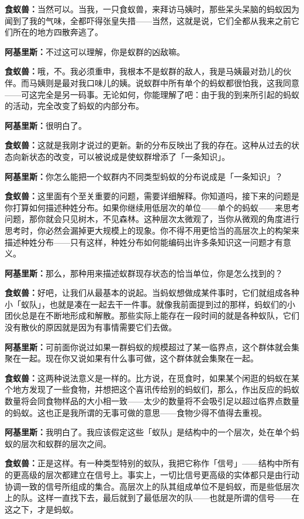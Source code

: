 \documentclass[
  12pt,
  twoside,
  openright,
  oldfontcommands,
]{memoir}
\newcommand{\dialogname}[1]{{\heifamily\bfseries #1}}
\begin{document}
\dialogname{食蚁兽：}当然可以。当我，一只食蚁兽，来拜访马姨时，那些呆头呆脑的蚂蚁因为闻到了我的气味，全都吓得张皇失措------当然，这就是说，它们全都从我来之前它们所在的地方四散奔逃了。

\dialogname{阿基里斯：}不过这可以理解，你是蚁群的凶敌嘛。

\dialogname{食蚁兽：}哦，不。我必须重申，我根本不是蚁群的敌人，我是马姨最对劲儿的伙伴。而马姨则是最对我口味儿的姨。说蚁群中所有单个的蚂蚁都很怕我，这我同意------可这完全是另一码事。无论如何，你能理解了吧：由于我的到来所引起的蚂蚁的活动，完全改变了蚂蚁的内部分布。

\dialogname{阿基里斯：}很明白了。

\dialogname{食蚁兽：}这就是我刚才说过的更新。新的分布反映出了我的存在。这种从过去的状态向新状态的改变，可以被说成是使蚁群增添了「一条知识」。

\dialogname{阿基里斯：}你怎么能把一个蚁群内不同类型蚂蚁的分布说成是「一条知识」？

\dialogname{食蚁兽：}这里面有个至关重要的问题，需要详细解释。你知道吗，接下来的问题是你打算如何描述种姓分布。如果你继续用低层次的单位------单个的蚂蚁------来思考问题，那你就会只见树木，不见森林。这种层次太微观了，当你从微观的角度进行思考时，你必然会漏掉更大规模上的现象。你不得不用更恰当的高层次上的构架来描述种姓分布------只有这样，种姓分布如何能编码出许多条知识这一问题才有意义。

\dialogname{阿基里斯：}那么，那种用来描述蚁群现存状态的恰当单位，你是怎么找到的？

\dialogname{食蚁兽：}好吧，让我们从最基本的说起。当蚂蚁想做成某件事时，它们就组成各种小「蚁队」，也就是凑在一起去干一件事。就像我前面提到过的那样，蚂蚁们的小团伙总是在不断地形成和解散。那些实际上能存在一段时间的就是各种蚁队，它们没有散伙的原因就是因为有事情需要它们去做。

\dialogname{阿基里斯：}可前面你说过如果一群蚂蚁的规模超过了某一临界点，这个群体就会集聚在一起。现在你又说如果有什么事可做，这个群体就会集聚在一起。

\dialogname{食蚁兽：}这两种说法意义是一样的。比方说，在觅食时，如果某个闲逛的蚂蚁在某个地方发现了一些食物，并想把这个喜讯传给别的蚂蚁们，那么，作出反应的蚂蚁数量将会同食物样品的大小相一致------太少的数量将不会吸引足以超过临界点数量的蚂蚁。这也正是我所谓的无事可做的意思------食物少得不值得去重视。

\dialogname{阿基里斯：}我明白了。我应该假定这些「蚁队」是结构中的一个层次，处在单个蚂蚁的层次和蚁群的层次之间。

\dialogname{食蚁兽：}正是这样。有一种类型特别的蚁队，我把它称作「信号」------结构中所有的更高级的层次都建立在信号上。事实上，一切比信号更高级的实体都只是由行动协调一致的信号所组成的集合。高层次上的队其组成单位不是蚂蚁，而是些低层次上的队。这样一直找下去，最后就到了最低层次的队------也就是所谓的信号------在这之下，才是蚂蚁。
\end{document}
